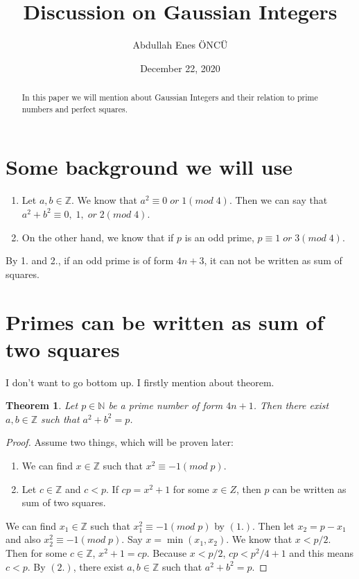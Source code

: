 \documentclass{article}
\title{Discussion on Gaussian Integers}
\author{Abdullah Enes ÖNCÜ}
\date{December 22, 2020}
\begin{document}
\maketitle



\newtheorem{theorem}{Theorem}
\newtheorem{lemma}{Lemma}

\DeclarePairedDelimiter\ceil{\lceil}{\rceil}
\DeclarePairedDelimiter\floor{\lfloor}{\rfloor}

\begin{abstract}
    In this paper we will mention about Gaussian Integers and their relation to prime numbers and perfect squares.
\end{abstract}

\section{Some background we will use}

\begin{enumerate}
\item Let $a,b \in \mathbb{Z}.$ We know that $a^2 \equiv 0 \; or \; 1 (mod\; 4)$. Then we can say that $a^2+b^2 \equiv 0, \; 1, \; or \; 2(mod\; 4)$.
\item On the other hand, we know that if $p$ is an odd prime, $p \equiv 1 \; or \; 3(mod\;4)$.
\end{enumerate}
By 1. and 2., if an odd prime is of form $4n+3$, it can not be written as sum of squares.

\section{Primes can be written as sum of two squares}

I don't want to go bottom up. I firstly mention about theorem.

\begin{theorem}
Let $p \in \mathbb{N}$ be a prime number of form $4n+1$. Then there exist $a,b\in \mathbb{Z}$ such that $a^2+b^2=p$.
\end{theorem}

\begin{proof}
Assume two things, which will be proven later:
\begin{enumerate}
    \item We can find $x\in \mathbb{Z}$ such that $x^2\equiv-1(mod\; p)$.
    \item Let $c\in\mathbb{Z}$ and $c<p$. If $cp=x^2+1$ for some $x\in{Z}$, then $p$ can be written as sum of two squares.
\end{enumerate}
\: We can find $x_1\in\mathbb{Z}$ such that $x_1^2\equiv-1(mod\; p)$ by $(1.)$. Then let $x_2=p-x_1$ and also $x_2^2\equiv-1(mod\; p)$. Say $x=\min(x_1, x_2)$. We know that $x<p/2$. 
Then for some $c\in\mathbb{Z}$, $x^2+1=cp$. Because $x<p/2$, $cp < p^2/4+1$ and this means $c<p$.
By $(2.)$, there exist $a,b\in \mathbb{Z}$ such that $a^2+b^2=p$.
\end{proof}
\end{document}
